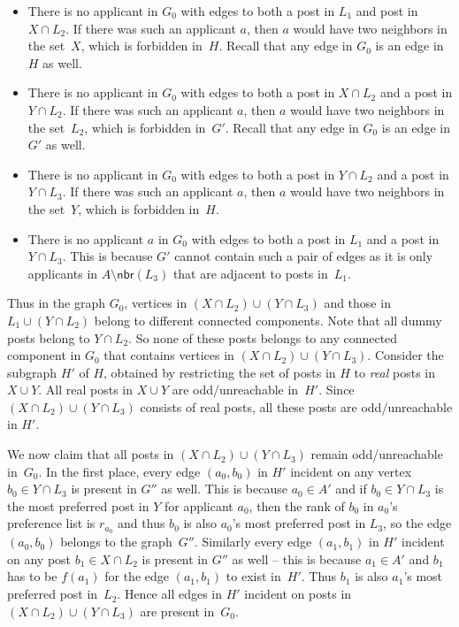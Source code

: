 \documentclass[11pt]{llncs}
\newcommand{\Nbr}{\mathsf{nbr}}
\begin{document}
\begin{itemize}
\item There is no applicant in $G_0$ with edges to both a post in $L_1$ and post in 
$X \cap L_2$. If there was such an applicant $a$, then $a$ would have two
neighbors in the set~$X$, which is forbidden in~$H$. Recall that
any edge in $G_0$ is an edge in $H$ as well. 
\item There is no applicant in $G_0$ with edges to both a post in $X \cap L_2$ and a post in 
$Y \cap L_2$. If there was such an applicant $a$, then $a$ would have two
neighbors in the set~$L_2$, which is forbidden in~$G'$. Recall that
any edge in $G_0$ is an edge in $G'$ as well. 
\item There is no applicant in $G_0$ with edges to both a post in $Y \cap L_2$ and a post in 
$Y \cap L_3$. If there was such an applicant $a$, then $a$ would have two
neighbors in the set~$Y$, which is forbidden in~$H$.
\item There is no applicant $a$ in $G_0$ with edges to both a post in $L_1$ and a post in 
$Y \cap L_3$. This is because $G'$ cannot contain such a pair of edges as it is only applicants 
in $A \setminus \Nbr(L_3)$ that are adjacent to posts in~$L_1$.
\end{itemize}

Thus in the graph $G_0$, vertices in  $(X \cap L_2) \cup (Y \cap L_3)$ and those in 
$L_1 \cup (Y \cap L_2)$ belong to different connected components. 
Note that all dummy posts belong to $Y \cap L_2$. So none of these posts belongs to any
connected component in $G_0$ that contains vertices in  $(X \cap L_2) \cup (Y \cap L_3)$.
Consider the subgraph $H'$ of $H$,  obtained by restricting the set of posts in $H$ to 
{\em real} posts in $X \cup Y$. All real posts in $X \cup Y$ are odd/unreachable in~$H'$.  
Since $(X \cap L_2) \cup (Y \cap L_3)$ consists of real posts, all these posts are 
odd/unreachable in $H'$.

\smallskip

We now claim that all posts in $(X \cap L_2) \cup (Y \cap L_3)$ remain odd/unreachable in~$G_0$. 
In the first place, every edge $(a_0,b_0)$ in $H'$ incident on any vertex $b_0 \in Y \cap L_3$ 
is present in $G''$ as well. This is because  $a_0 \in A'$ and if $b_0 \in Y \cap L_3$ is the 
most preferred post in $Y$ for applicant $a_0$, then the rank of $b_0$ in $a_0$'s preference 
list is $r_{a_0}$ and thus $b_0$ is also $a_0$'s most preferred post in $L_3$, so the edge 
$(a_0,b_0)$ belongs to the graph~$G''$. Similarly every edge $(a_1,b_1)$ in $H'$ incident on 
any post $b_1 \in X \cap L_2$ is present in $G''$ as well -- this is  because $a_1 \in A'$ 
and $b_1$ has to be $f(a_1)$ for the edge $(a_1,b_1)$ to exist in~$H'$. Thus $b_1$ is also 
$a_1$'s most preferred post in~$L_2$. Hence all edges in $H'$ incident on posts in 
$(X \cap L_2) \cup (Y \cap L_3)$ are present in~$G_0$.
\end{document}
